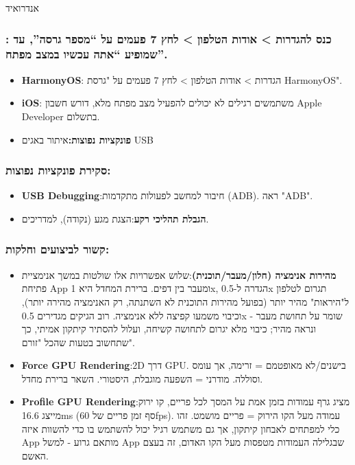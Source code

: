 


אנדרואיד

\subsubsection*{: כנס להגדרות > אודות הטלפון > לחץ 7 פעמים על “מספר גרסה”, עד שמופיע “אתה עכשיו במצב מפתח”.}

\begin{itemize}
  \item \textbf{HarmonyOS}: הגדרות > אודות הטלפון > לחץ 7 פעמים על "גרסת HarmonyOS".
  \item \textbf{iOS}: משתמשים רגילים לא יכולים להפעיל מצב מפתח מלא, דורש חשבון Apple Developer בתשלום.
  \item \textbf{פונקציות נפוצות:}איתור באגים USB
\end{itemize}

\subsubsection*{סקירת פונקציות נפוצות:}

\begin{itemize}
  \item \textbf{USB Debugging}:חיבור למחשב לפעולות מתקדמות (ADB). ראה "ADB".
  \item \textbf{הגבלת תהליכי רקע}:הצגת מגע (נקודה), למדריכים.
\end{itemize}

\subsubsection*{קשור לביצועים וחלקות:}

\begin{itemize}
  \item \textbf{מהירות אנימציה (חלון/מעבר/תוכנית)}:שלוש אפשרויות אלו שולטות במשך אנימציית פתיחת App ומעבר בין דפים. ברירת המחדל היא 1x, הגדרה ל-0.5x תגרום לטלפון ל"היראות" מהיר יותר (בפועל מהירות התוכנית לא השתנתה, רק האנימציה מהירה יותר), וכיבוי משמעו קפיצה ללא אנימציה. רוב הגיקים מגדירים 0.5x - שומר על תחושת מעבר ונראה מהיר; כיבוי מלא יגרום לתחושה קשיחה, ועלול להסתיר קיתקון אמיתי, כך שתחשוב בטעות שהכל "זורם".
  \item \textbf{Force GPU Rendering}:2D דרך GPU. בישנים/לא מאופטמם = זרימה, אך עומס וסוללה. מודרני = השפעה מוגבלת, היסטורי. השאר ברירת מחדל.
  \item \textbf{Profile GPU Rendering}:מציג גרף עמודות בזמן אמת על המסך לכל פריים, קו ירוק מייצג 16.6ms (סף זמן פריים של 60fps). עמודה מעל הקו הירוק = פריים מושמט. זהו כלי למפתחים לאבחון קיתקון, אך גם משתמש רגיל יכול להשתמש בו כדי להשוות איזה App מותאם גרוע - למשל App שבגלילה העמודות מטפסות מעל הקו האדום, זה בעצם האשם.
\end{itemize}

